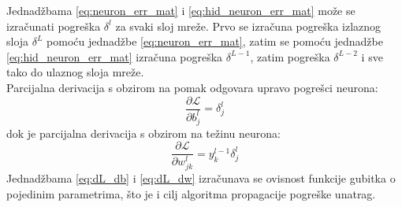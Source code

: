 \documentclass[times, utf8, zavrsni, numeric]{fer}
\begin{document}
Jednadžbama \ref{eq:neuron_err_mat} i \ref{eq:hid_neuron_err_mat} može se
izračunati pogreška $\delta^l$ za svaki sloj mreže. Prvo se izračuna
pogreška izlaznog sloja $\delta^L$ pomoću jednadžbe \ref{eq:neuron_err_mat},
zatim se pomoću jednadžbe \ref{eq:hid_neuron_err_mat} izračuna pogreška
$\delta^{L-1}$, zatim pogreška $\delta^{L-2}$ i sve tako do ulaznog sloja
mreže.\\\indent
Parcijalna derivacija s obzirom na pomak odgovara upravo pogrešci neurona:
\begin{equation}
	\frac{\partial \mathcal{L}}{\partial b_j^l} = \delta_j^l
	\label{eq:dL_db}
\end{equation}
dok je parcijalna derivacija s obzirom na težinu neurona:
\begin{equation}
	\frac{\partial \mathcal{L}}{\partial w_{jk}^l} = y_k^{l-1} \delta_j^l
	\label{eq:dL_dw}
\end{equation}
Jednadžbama \ref{eq:dL_db} i \ref{eq:dL_dw} izračunava se ovisnost funkcije
gubitka o
pojedinim parametrima, što je i cilj algoritma propagacije pogreške unatrag.
\end{document}
